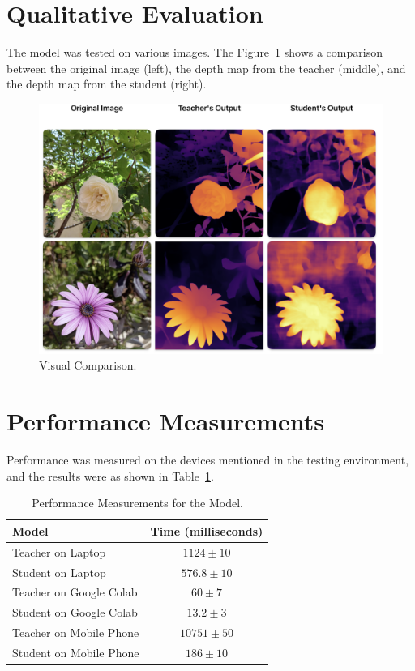 \section{Qualitative Evaluation}
\label{sec:qualitative_eval}

The model was tested on various images. The Figure~\ref{fig:qualitative_comp} shows a comparison between the original image (left), the depth map from the teacher (middle), and the depth map from the student (right).

\begin{figure}[htbp!]
    \centering
    \includegraphics[width=\textwidth]{images/qualitative_comparison.png}
    \caption{Visual Comparison.}
    \label{fig:qualitative_comp}
\end{figure}

\section{Performance Measurements}
\label{sec:performance}

Performance was measured on the devices mentioned in the testing environment, and the results were as shown in Table~\ref{tab:performance}.

\begin{table}[htbp!]
    \centering
    \caption{Performance Measurements for the Model.}
    \label{tab:performance}
    \begin{tabular}{lc}
        \toprule
        \textbf{Model} & \textbf{Time (milliseconds)} \\
        \midrule
        Teacher on Laptop & $1124 \pm 10$ \\
        Student on Laptop & $576.8 \pm 10$ \\
        Teacher on Google Colab & $60 \pm 7$ \\
        Student on Google Colab & $13.2 \pm 3$ \\
        Teacher on Mobile Phone & $10751 \pm 50$ \\
        Student on Mobile Phone & $186 \pm 10$ \\
        \bottomrule
    \end{tabular}
\end{table}

